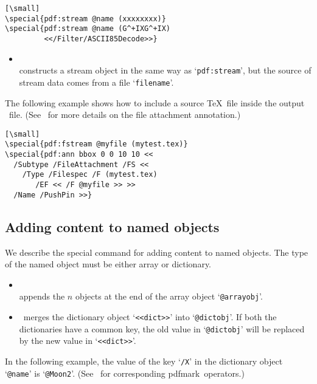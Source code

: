 \documentclass[final]{ltugboat}
\def\pdfmark{pdfmark}
\def\fafter{1.5pt}
\begin{document}
\begin{verbatim}[\small]
\special{pdf:stream @name (xxxxxxxx)}
\special{pdf:stream @name (G^+IXG^+IX)
         <</Filter/ASCII85Decode>>}
\end{verbatim}

\begin{itemize}
\item{} \\[\fafter]
constructs a stream object in the same way as `\texttt{pdf:stream}', but the source of stream data comes from a file `\texttt{filename}'.
\end{itemize}

\noindent
The following example shows how to include a source \TeX\ file inside the output \PDF\ file. (See~\cite[p.~637]{PDFReference} for more details on the file attachment annotation.)

\begin{verbatim}[\small]
\special{pdf:fstream @myfile (mytest.tex)}
\special{pdf:ann bbox 0 0 10 10 <<
  /Subtype /FileAttachment /FS <<
    /Type /Filespec /F (mytest.tex)
       /EF << /F @myfile >> >>
  /Name /PushPin >>}
\end{verbatim}


\subsection{Adding content to named objects}

We describe the special command for adding content to named objects. The type of the named object must be either array or dictionary.

\begin{itemize}
\item{} \\[\fafter]
appends the $n$ objects at the end of the array object `\texttt{@arrayobj}'.
\item{} \ merges the dictionary object `\texttt{<<dict>>}' into `\texttt{@dictobj}'. If both the dictionaries have a common key, the old value in `\texttt{@dictobj}' will be replaced by the new value in `\texttt{<<dict>>}'.
\end{itemize}

\noindent
In the following example, the value of the key `\texttt{/X}' in the dictionary object `\texttt{@name}' is `\texttt{@Moon2}'.
(See~\cite[p.~15]{pdfmark} for corresponding \pdfmark\ operators.)
\end{document}
